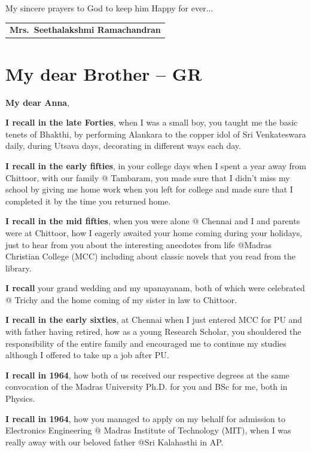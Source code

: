 My sincere prayers to God to keep him Happy for ever...
\bigskip

\begin{flushright}
\begin{tabular}{c}
\textbf{Mrs.\ Seethalakshmi Ramachandran}
\end{tabular}
\end{flushright}
\bigskip

\section*{My dear Brother – GR}

\noindent 
\textbf{My dear Anna},

\textbf{I recall in the late Forties}, when I was a small boy, you taught me the basic tenets of Bhakthi, by performing Alankara to the copper idol of Sri Venkateswara daily, during Utsava days, decorating in different ways each day.

\textbf{I recall in the early fifties}, in your college days when I spent a year away from Chittoor, with our family @ Tambaram, you made sure that I didn’t miss my school by giving me home work when you left for college and made sure that I completed it by the time you returned home.

\textbf{I recall in the mid fifties}, when you were alone @ Chennai and I and parents were at Chittoor, how I eagerly awaited your home coming during your holidays, just to hear from you about the interesting anecdotes from life @Madras Christian  College (MCC) including about classic novels that you read from the library.

\textbf{I recall} your grand wedding and my upanayanam, both of which were celebrated @ Trichy and the home coming of my sister in law to Chittoor.

\textbf{I recall in the early sixties}, at Chennai when I just entered MCC for PU and with father having retired, how as a young Research Scholar, you shouldered the responsibility of the entire family and encouraged me to continue my studies although I offered to take up a job after PU.

\textbf{I recall in 1964}, how both of us received our respective degrees at the same convocation of the Madras University Ph.D. for you and BSc for me, both in Physics.

\textbf{I recall in 1964}, how you managed to apply on my behalf for admission to Electronics Engineering @ Madras Institute of Technology (MIT), when I was really away with our beloved father @Sri Kalahasthi in AP.

